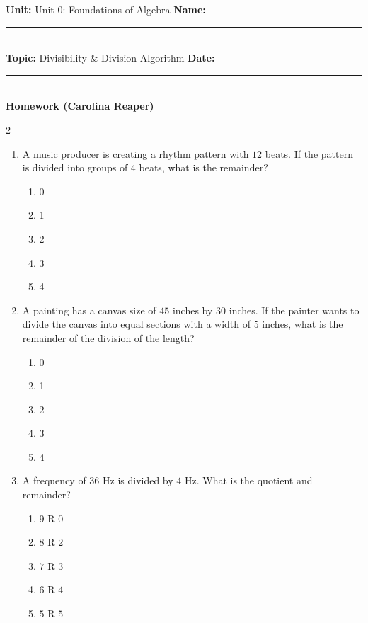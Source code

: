 \documentclass[10pt]{article}
\begin{document}
\enlargethispage{2.5cm}

\begin{tcolorbox}[colback=mainblue!5, colframe=mainblue, sharp corners, boxrule=0.5pt]
    \small \textbf{Unit:} Unit 0: Foundations of Algebra \hfill \textbf{Name:} \rule{3cm}{0.4pt} \\
    \small \textbf{Topic:} Divisibility & Division Algorithm \hfill \textbf{Date:} \rule{2cm}{0.4pt} \\
    \centering \textbf{\large Homework (Carolina Reaper)}
\end{tcolorbox}

\vspace{0.2cm}

\begin{multicols}{2}
\begin{enumerate}[label=\textbf{Q\arabic*.}, leftmargin=*, itemsep=6pt, parsep=0pt]

  \item \small A music producer is creating a rhythm pattern with $12$ beats. If the pattern is divided into groups of $4$ beats, what is the remainder?
  \begin{enumerate}[label=(\Alph*), leftmargin=0.6cm, nosep, itemsep=2pt]
    \item 0
    \item 1
    \item 2
    \item 3
    \item 4
  \end{enumerate}

  \item \small A painting has a canvas size of $45$ inches by $30$ inches. If the painter wants to divide the canvas into equal sections with a width of $5$ inches, what is the remainder of the division of the length?
  \begin{enumerate}[label=(\Alph*), leftmargin=0.6cm, nosep, itemsep=2pt]
    \item 0
    \item 1
    \item 2
    \item 3
    \item 4
  \end{enumerate}

  \item \small A frequency of $36$ Hz is divided by $4$ Hz. What is the quotient and remainder?
  \begin{enumerate}[label=(\Alph*), leftmargin=0.6cm, nosep, itemsep=2pt]
    \item $9$ R $0$
    \item $8$ R $2$
    \item $7$ R $3$
    \item $6$ R $4$
    \item $5$ R $5$
  \end{enumerate}


\end{enumerate}
\end{multicols}
\end{document}

